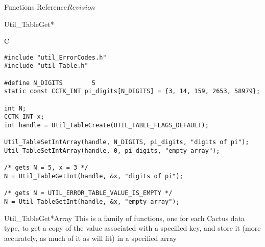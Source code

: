 \begin{cactuspart}{ Functions Reference}{}{$Revision$}
\begin{FunctionDescription}{Util\_TableGet*}
\begin{ExampleSection}
\begin{Example}{C}
\begin{verbatim}
#include "util_ErrorCodes.h"
#include "util_Table.h"

#define N_DIGITS        5
static const CCTK_INT pi_digits[N_DIGITS] = {3, 14, 159, 2653, 58979};

int N;
CCTK_INT x;
int handle = Util_TableCreate(UTIL_TABLE_FLAGS_DEFAULT);

Util_TableSetIntArray(handle, N_DIGITS, pi_digits, "digits of pi");
Util_TableSetIntArray(handle, 0, pi_digits, "empty array");

/* gets N = 5, x = 3 */
N = Util_TableGetInt(handle, &x, "digits of pi");

/* gets N = UTIL_ERROR_TABLE_VALUE_IS_EMPTY */
N = Util_TableGetInt(handle, &x, "empty array");
\end{verbatim}
\end{Example}
\end{ExampleSection}
\end{FunctionDescription}


\begin{FunctionDescription}{Util\_TableGet*Array}
\label{Util-TableGet*Array}
This is a family of functions, one for each Cactus data type,
to get a copy of the value associated with a specified key, and store
it (more accurately, as much of it as will fit) in a specified array


\end{FunctionDescription}
\end{cactuspart}
